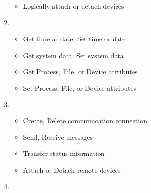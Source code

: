 \begin{definition}
\begin{enumerate}[noitemsep]
\begin{itemize}[noitemsep]
    \item Logically attach or detach devices
    \end{itemize}
  \item {}
    \begin{itemize}[noitemsep]
    \item Get time or date, Set time or date
    \item Get system data, Set system data
    \item Get Process, File, or Device attributes
    \item Set Process, File, or Device attributes
    \end{itemize}
  \item {}
    \begin{itemize}[noitemsep]
    \item Create, Delete communication connection
    \item Send, Receive messages
    \item Transfer status information
    \item Attach or Detach remote devices
    \end{itemize}
  \item {}
  \end{enumerate}
\end{definition}


